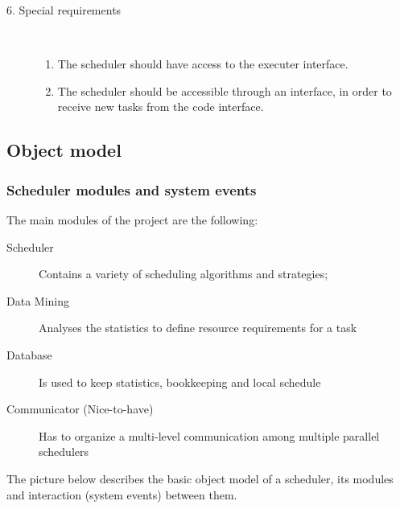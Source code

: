 \begin{description}
\item [6. Special requirements]\hfill \\
\vspace{-6.5mm}
\begin{enumerate}
\item The scheduler should have access to the executer interface.
\item The scheduler should be accessible through an interface, in order to receive new tasks from the code interface.
\end{enumerate}

\end{description}

\newpage
\subsection{Object model}

\vspace{0.5cm}
\subsubsection{Scheduler modules and system events}
\vspace{0.5cm}
The main modules of the project are the following:
\begin{description}
\item[Scheduler] Contains a variety of scheduling algorithms and strategies;
\item[Data Mining] Analyses the statistics to define resource requirements for a task
\item[Database] Is used to keep statistics, bookkeeping and local schedule
\item[Communicator (Nice-to-have)] Has to organize a multi-level communication among
multiple parallel schedulers
\end{description}
\vspace{1cm}
The picture below describes the basic object model of a scheduler, its modules and interaction (system events) between them.

